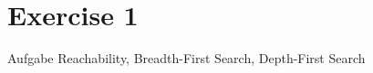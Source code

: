 
\section{Exercise 1}

\setcounter{exercise}{1}

\begin{frame}[allowframebreaks]{Aufgabe \thesection}{Reachability, Breadth-First Search, Depth-First Search}
  \begin{solutionnoinc}
    \centering
  \end{solutionnoinc}
  \begin{solution}
    \centering
  \end{solution}
  \begin{solutionnoinc}
    \centering
  \end{solutionnoinc}
  \begin{solutionnoinc}
    \centering
  \end{solutionnoinc}
  \begin{solutionnoinc}
    \centering
  \end{solutionnoinc}
\end{frame}

